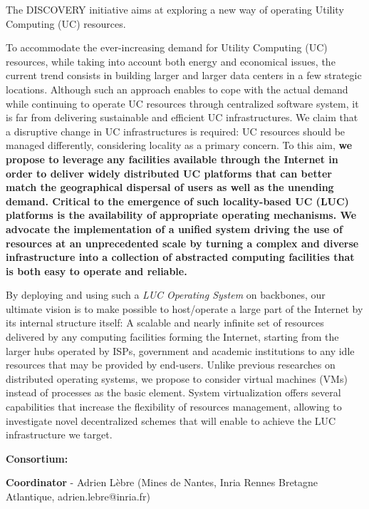 \documentclass[11pt,a4paper,twoside]{article}
\begin{document}
\vspace*{.1cm}
\noindent\parbox{1\textwidth}{
The DISCOVERY initiative aims at exploring a new way of operating Utility Computing (UC) resources. 

\medskip
To accommodate the ever-increasing demand for Utility Computing (UC) resources, while taking
into account both energy and economical issues, the current trend consists in
building larger and larger data centers in a few strategic locations. Although
such an approach enables to cope with the actual demand 
while continuing to operate UC resources through centralized
software system, it is far from delivering sustainable and efficient UC infrastructures. 
%
We claim that a disruptive change in UC infrastructures is required: UC
resources should be managed differently, considering locality as a
primary concern. To this aim, \textbf{we propose to leverage any facilities available through the
Internet in order to deliver widely distributed UC platforms that can better
match the geographical dispersal of users as well as the unending demand.
Critical to the emergence of such locality-based UC (LUC) platforms is
the availability of appropriate operating mechanisms. We
advocate the implementation of a unified system driving the use of
resources at an unprecedented scale by turning a complex and diverse
infrastructure into a collection of abstracted computing facilities that is
both easy to operate and reliable.} 

\medskip
By deploying and using such a \emph{LUC Operating System} on backbones,
our ultimate vision is to make possible to host/operate a large part of the
Internet by its internal structure itself: A scalable and nearly infinite set
of resources delivered by any computing facilities forming the Internet,
starting from the larger hubs operated by ISPs, government and academic
institutions to any idle resources that may be provided by end-users. 
%
Unlike previous researches on distributed operating systems, we propose to
consider virtual machines (VMs) instead of processes as the basic element.  System
virtualization offers several capabilities that increase the flexibility of
resources management, allowing to investigate novel decentralized schemes that
will enable to achieve the LUC infrastructure we target.
} 


\bigskip
\noindent
\textbf{Consortium:}

\textbf{Coordinator} - Adrien L{\`e}bre (Mines de Nantes, Inria Rennes Bretagne Atlantique, adrien.lebre@inria.fr)
\end{document}
